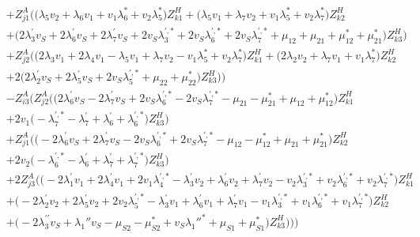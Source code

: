 \begin{align}
 &+Z_{{j 1}}^{A} \Big(\Big(\lambda_5 v_2  + \lambda_6 v_1  + v_1 \lambda_6^*  + v_2 \lambda_5^* \Big)Z_{{k 1}}^{H} +\Big(\lambda_5 v_1  + \lambda_7 v_2  + v_1 \lambda_5^*  + v_2 \lambda_7^* \Big)Z_{{k 2}}^{H} \nonumber \\ 
 &+\Big(2 \lambda^{\prime}_3 v_S  + 2 \lambda^{\prime}_6 v_S  + 2 \lambda^{\prime}_7 v_S  + 2 v_S \lambda^{{\prime},*}_3  + 2 v_S \lambda^{{\prime},*}_6  + 2 v_S \lambda^{{\prime},*}_7  + \mu_{12} + \mu_{21} + \mu_{12}^* + \mu_{21}^*\Big)Z_{{k 3}}^{H} \Big)\nonumber \\ 
 &+Z_{{j 2}}^{A} \Big(\Big(2 \lambda_3 v_1  + 2 \lambda_4 v_1  - \lambda_5 v_1  + \lambda_7 v_2  - v_1 \lambda_5^*  + v_2 \lambda_7^* \Big)Z_{{k 1}}^{H} +\Big(2 \lambda_2 v_2  + \lambda_7 v_1  + v_1 \lambda_7^* \Big)Z_{{k 2}}^{H} \nonumber \\ 
 &+2 \Big(2 \lambda^{\prime}_2 v_S  + 2 \lambda^{\prime}_5 v_S  + 2 v_S \lambda^{{\prime},*}_5  + \mu_{22} + \mu_{22}^*\Big)Z_{{k 3}}^{H} \Big)\Big)\nonumber \\ 
 &- Z_{{i 3}}^{A} \Big(Z_{{j 2}}^{A} \Big(\Big(2 \lambda^{\prime}_6 v_S  -2 \lambda^{\prime}_7 v_S  + 2 v_S \lambda^{{\prime},*}_6  -2 v_S \lambda^{{\prime},*}_7  - \mu_{21}  - \mu_{21}^*  + \mu_{12} + \mu_{12}^*\Big)Z_{{k 1}}^{H} \nonumber \\ 
 &+2 v_1 \Big(- \lambda^{{\prime},*}_7  - \lambda^{\prime}_7  + \lambda^{\prime}_6 + \lambda^{{\prime},*}_6\Big)Z_{{k 3}}^{H} \Big)\nonumber \\ 
 &+Z_{{j 1}}^{A} \Big(\Big(-2 \lambda^{\prime}_6 v_S  + 2 \lambda^{\prime}_7 v_S  -2 v_S \lambda^{{\prime},*}_6  + 2 v_S \lambda^{{\prime},*}_7  - \mu_{12}  - \mu_{12}^*  + \mu_{21} + \mu_{21}^*\Big)Z_{{k 2}}^{H} \nonumber \\ 
 &+2 v_2 \Big(- \lambda^{{\prime},*}_6  - \lambda^{\prime}_6  + \lambda^{\prime}_7 + \lambda^{{\prime},*}_7\Big)Z_{{k 3}}^{H} \Big)\nonumber \\ 
 &+2 Z_{{j 3}}^{A} \Big(\Big(-2 \lambda^{\prime}_1 v_1  + 2 \lambda^{\prime}_4 v_1  + 2 v_1 \lambda^{{\prime},*}_4  - \lambda^{\prime}_3 v_2  + \lambda^{\prime}_6 v_2  + \lambda^{\prime}_7 v_2  - v_2 \lambda^{{\prime},*}_3  + v_2 \lambda^{{\prime},*}_6  + v_2 \lambda^{{\prime},*}_7 \Big)Z_{{k 1}}^{H} \nonumber \\ 
 &+\Big(-2 \lambda^{\prime}_2 v_2  + 2 \lambda^{\prime}_5 v_2  + 2 v_2 \lambda^{{\prime},*}_5  - \lambda^{\prime}_3 v_1  + \lambda^{\prime}_6 v_1  + \lambda^{\prime}_7 v_1  - v_1 \lambda^{{\prime},*}_3  + v_1 \lambda^{{\prime},*}_6  + v_1 \lambda^{{\prime},*}_7 \Big)Z_{{k 2}}^{H} \nonumber \\ 
 &+\Big(-2 \lambda^{\prime\prime}_3 v_S  + \lambda_1'' v_S  - \mu_{S2}  - \mu_{S2}^*  + v_S \lambda_1''^*  + \mu_{S1} + \mu_{S1}^*\Big)Z_{{k 3}}^{H} \Big)\Big)\Big)\end{align} 
